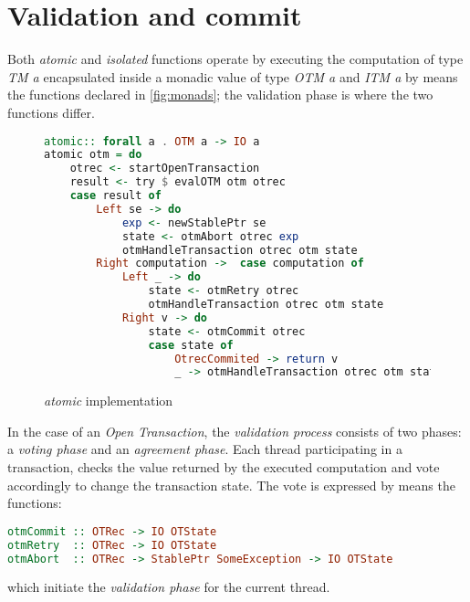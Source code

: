 \section{Validation and commit}

Both \emph{atomic} and \emph{isolated} functions operate by executing the computation of type \emph{TM a} encapsulated inside a monadic value of type \emph{OTM a} and \emph{ITM a} by means the functions declared in \cref{fig:monads}; the validation phase is where the two functions differ.


\begin{figure}
\begin{lstlisting}[language=Haskell]
atomic:: forall a . OTM a -> IO a
atomic otm = do
    otrec <- startOpenTransaction
    result <- try $ evalOTM otm otrec
    case result of
        Left se -> do
            exp <- newStablePtr se
            state <- otmAbort otrec exp
            otmHandleTransaction otrec otm state
        Right computation ->  case computation of
            Left _ -> do
                state <- otmRetry otrec
                otmHandleTransaction otrec otm state
            Right v -> do
                state <- otmCommit otrec
                case state of
                    OtrecCommited -> return v
                    _ -> otmHandleTransaction otrec otm state
\end{lstlisting}
\caption{\emph{atomic} implementation}
\label{fig:atomic}
\end{figure}

In the case of an \emph{Open Transaction}, the \emph{validation process} consists of two phases: a \emph{voting phase} and an \emph{agreement phase}.
Each thread participating in a transaction, checks the value returned by the executed computation and vote accordingly to change the transaction state.
\newpage
The vote is expressed by means the functions:
\begin{lstlisting}[language=Haskell,showlines=false]
otmCommit :: OTRec -> IO OTState
otmRetry  :: OTRec -> IO OTState
otmAbort  :: OTRec -> StablePtr SomeException -> IO OTState
\end{lstlisting}
which initiate the \emph{validation phase} for the current thread.

